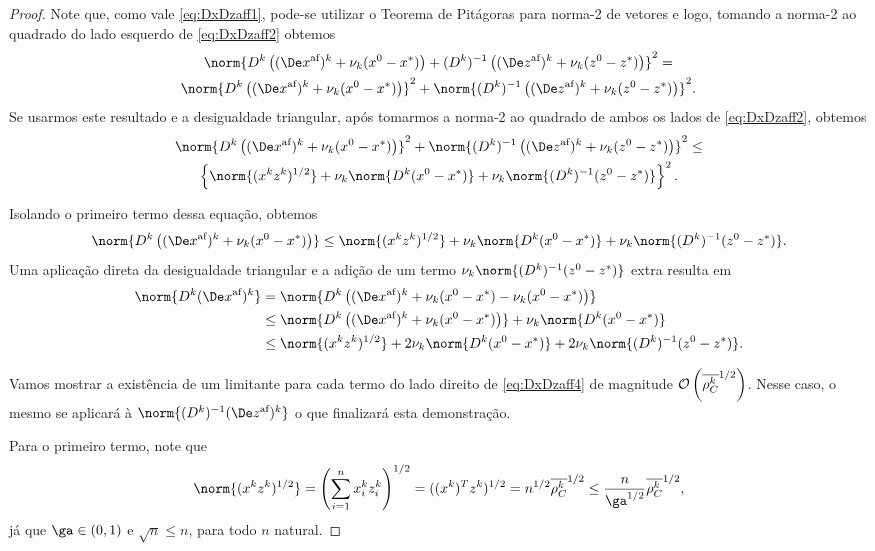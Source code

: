 \begin{proof}
	 Note que, como vale  \eqref{eq:DxDzaff1}, pode-se utilizar o Teorema de Pitágoras para norma-2 de vetores e logo, tomando a norma-2 ao quadrado do lado esquerdo de \eqref{eq:DxDzaff2} obtemos
	\begin{multline*}
			 	 \norm{\Dk\left( \dekx +  \nuk (\xzero - \xstar)\right)+ \Dik \left( \dekz  +  \nuk (\zzero - \zstar)\right)}^{2} =\\
	 	 	 	 	 \norm{\Dk\left( \dekx +  \nuk (\xzero - \xstar)\right)}^{2}+ \norm{\Dik \left( \dekz  +  \nuk (\zzero - \zstar)\right)}^{2}.
	\end{multline*}
	 Se  usarmos este resultado e a desigualdade triangular, após tomarmos a norma-2 ao quadrado de ambos os lados de \eqref{eq:DxDzaff2}, obtemos 
	 \begin{multline*}\label{eq:DxDzaff3}
	 \norm{\Dk\left( \dekx +  \nuk (\xzero - \xstar)\right)}^{2}+ \norm{\Dik \left( \dekz  +  \nuk (\zzero - \zstar)\right)}^{2} \leq \\ 
	 \left\{ \norm{(  \xk \zk   )^{1/2}} + \nuk  \norm{\Dk(\xzero - \xstar)} + \nuk  \norm{\Dik(\zzero - \zstar)} \right\}^{2}.
	 \end{multline*}

Isolando o primeiro termo dessa equação, obtemos
\[
\norm{\Dk\left( \dekx +  \nuk (\xzero - \xstar)\right)} \leq  
	  \norm{(  \xk \zk  )^{1/2}} + \nuk  \norm{\Dk(\xzero - \xstar)} + \nuk  \norm{\Dik(\zzero - \zstar)}.
\]
Uma aplicação direta da desigualdade triangular e a adição de um termo  $\nuk  \norm{\Dik(\zzero - \zstar)}$ extra resulta em
\begin{align}
	\norm{\Dk \dekx} & =  \norm{\Dk\left( \dekx  +  \nuk (\xzero - \xstar)  -  \nuk (\xzero - \xstar)\right)} \notag \\ 
				 & \leq	 \norm{\Dk\left( \dekx  +  \nuk (\xzero - \xstar)\right)} +  \nuk \norm{\Dk(\xzero - \xstar)} \notag \\
				 & \leq \norm{(  \xk \zk  )^{1/2}} + 2 \nuk  \norm{\Dk(\xzero - \xstar)} + 2\nuk  \norm{\Dik(\zzero - \zstar)}.\label{eq:DxDzaff4}
\end{align}

Vamos mostrar a existência de um limitante para cada termo do lado direito de \eqref{eq:DxDzaff4} de magnitude $\mathcal{O}\left(\overline{\rho_C^{k}} ^{1/2}\right)$. Nesse caso, o mesmo se aplicará à $\norm{\Dik \dekz }$ o que finalizará esta demonstração.

Para o primeiro termo, note que 
\begin{equation}
	\label{eq:DxDzaff5}
	\norm{(  \xk \zk  )^{1/2}} = \left(\sum_{i=1}^{n}\xk_i \zk_i\right)^{1/2} = ((\xk)^{T}\zk)^{1/2} = n^{1/2}\rhoCkb ^{1/2} \leq \frac{n}{\ga^{1/2}}\rhoCkb ^{1/2},
\end{equation}
já que $\ga\in(0,1)$ e $\sqrt{n}\leq n$, para todo $n$ natural.


\end{proof}

